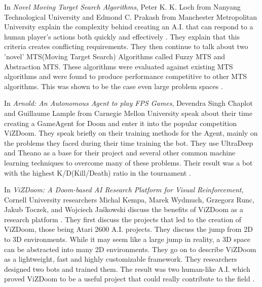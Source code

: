 In {\it Novel Moving Target Search Algorithms}, Peter K. K. Loch from Nanyang Technological University and Edmond C. Prakash from Manchester Metropolitan University explain the complexity behind creating an A.I. that can respond to a human player's actions both quickly and effectively \cite{Loh:2009}. They explain that this criteria creates conflicting requirements. They then continue to talk about two 'novel' MTS(Moving Target Search) Algorithms called Fuzzy MTS and Abstraction MTS. These algorithms were evaluated against existing MTS algorithms and were found to produce performance competitive to other MTS algorithms. This was shown to be the case even large problem spaces \cite{Loh:2009}.

In {\it Arnold: An Autonomous Agent to play FPS Games}, Devendra Singh Chaplot and Guillaume Lample from Carnegie Mellon University speak about their time creating a GameAgent for Doom and enter it into the popular competition ViZDoom. They speak briefly on their training methods for the Agent, mainly on the problems they faced during their time training the bot. They use UltraDeep and Theano as a base for their project and several other common machine learning techniques to overcome many of these problems. Their result was a bot with the highest K/D(Kill/Death) ratio in the tournament \cite{Chaplot}.

In {\it ViZDoom: A Doom-based AI Research Platform for Visual Reinforcement}, Cornell University researchers Michal Kempa, Marek Wydmuch, Grzegorz Runc, Jakub Toczek, and Wojciech Jaśkowski discuss the benefits of ViZDoom as a research platform \cite{Kempka:2016}. They first discuss the projects that led to the creation of ViZDoom, those being Atari 2600 A.I. projects. They discuss the jump from 2D to 3D environments. While it may seem like a large jump in reality, a 3D space can be abstracted into many 2D environments. They go on to describe ViZDoom as a lightweight, fast and highly customizable framework. They researchers designed two bots and trained them. The result was two human-like A.I. which proved ViZDoom to be a useful project that could really contribute to the field \cite{Kempka:2016}.

